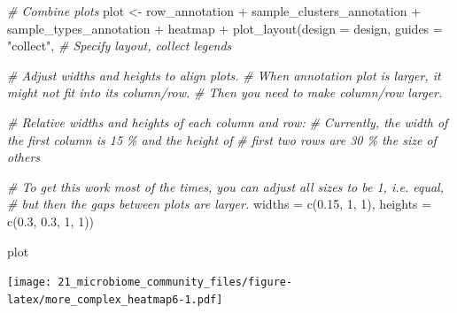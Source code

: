 \documentclass[
]{book}
\newenvironment{Shaded}{\begin{snugshade}}{\end{snugshade}}
\newcommand{\AttributeTok}[1]{\textcolor[rgb]{0.77,0.63,0.00}{#1}}
\newcommand{\CommentTok}[1]{\textcolor[rgb]{0.56,0.35,0.01}{\textit{#1}}}
\newcommand{\DecValTok}[1]{\textcolor[rgb]{0.00,0.00,0.81}{#1}}
\newcommand{\FloatTok}[1]{\textcolor[rgb]{0.00,0.00,0.81}{#1}}
\newcommand{\FunctionTok}[1]{\textcolor[rgb]{0.00,0.00,0.00}{#1}}
\newcommand{\NormalTok}[1]{#1}
\newcommand{\OtherTok}[1]{\textcolor[rgb]{0.56,0.35,0.01}{#1}}
\newcommand{\SpecialCharTok}[1]{\textcolor[rgb]{0.00,0.00,0.00}{#1}}
\newcommand{\StringTok}[1]{\textcolor[rgb]{0.31,0.60,0.02}{#1}}
\begin{document}
\begin{Shaded}
\begin{Highlighting}[]
\CommentTok{\# Combine plots}
\NormalTok{plot }\OtherTok{\textless{}{-}}\NormalTok{ row\_annotation }\SpecialCharTok{+}\NormalTok{ sample\_clusters\_annotation }\SpecialCharTok{+}\NormalTok{ sample\_types\_annotation }\SpecialCharTok{+}\NormalTok{ heatmap  }\SpecialCharTok{+}
    \FunctionTok{plot\_layout}\NormalTok{(}\AttributeTok{design =}\NormalTok{ design, }\AttributeTok{guides =} \StringTok{"collect"}\NormalTok{, }\CommentTok{\# Specify layout, collect legends}
                
                \CommentTok{\# Adjust widths and heights to align plots.}
                \CommentTok{\# When annotation plot is larger, it might not fit into its column/row.}
                \CommentTok{\# Then you need to make column/row larger.}
                
                \CommentTok{\# Relative widths and heights of each column and row:}
                \CommentTok{\# Currently, the width of the first column is 15 \% and the height of}
                \CommentTok{\# first two rows are 30 \% the size of others}
                
                \CommentTok{\# To get this work most of the times, you can adjust all sizes to be 1, i.e. equal, }
                \CommentTok{\# but then the gaps between plots are larger.}
                \AttributeTok{widths =} \FunctionTok{c}\NormalTok{(}\FloatTok{0.15}\NormalTok{, }\DecValTok{1}\NormalTok{, }\DecValTok{1}\NormalTok{),}
                \AttributeTok{heights =} \FunctionTok{c}\NormalTok{(}\FloatTok{0.3}\NormalTok{, }\FloatTok{0.3}\NormalTok{, }\DecValTok{1}\NormalTok{, }\DecValTok{1}\NormalTok{))}

\NormalTok{plot}
\end{Highlighting}
\end{Shaded}

\texttt{[image: 21\_microbiome\_community\_files/figure-latex/more\_complex\_heatmap6-1.pdf]}
\end{document}
